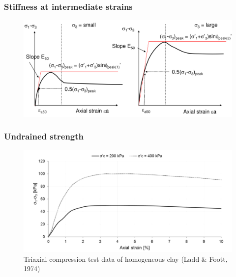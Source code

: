 \documentclass[notes]{beamer}
\begin{document}
\begin{frame}
\frametitle{Stiffness at intermediate strains}
\begin{figure}
	\includegraphics[width=\textwidth]{figs/stiffnes-intermediate-strain.png}
\end{figure}
\end{frame}


\begin{frame}
\frametitle{Undrained strength}
\begin{figure}
	\includegraphics[width=\textwidth]{figs/effect-sigma_c.png}
	\caption*{Triaxial compression test data of homogeneous clay (Ladd \& Foott, 1974)}
\end{figure}
\end{frame}
\end{document}
